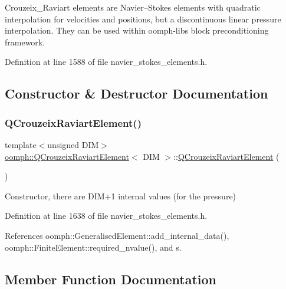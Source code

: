 Crouzeix\+\_\+\+Raviart elements are Navier--Stokes elements with quadratic interpolation for velocities and positions, but a discontinuous linear pressure interpolation. They can be used within oomph-\/lib\textquotesingle{}s block preconditioning framework. 

Definition at line 1588 of file navier\+\_\+stokes\+\_\+elements.\+h.



\subsection{Constructor \& Destructor Documentation}
\mbox{\label{classoomph_1_1QCrouzeixRaviartElement_a958e0749f4de49b210e17ad874f1ee2d}} 
\subsubsection{\texorpdfstring{Q\+Crouzeix\+Raviart\+Element()}{QCrouzeixRaviartElement()}}
{\footnotesize\ttfamily template$<$unsigned D\+IM$>$ \\
\hyperlink{classoomph_1_1QCrouzeixRaviartElement}{oomph\+::\+Q\+Crouzeix\+Raviart\+Element}$<$ D\+IM $>$\+::\hyperlink{classoomph_1_1QCrouzeixRaviartElement}{Q\+Crouzeix\+Raviart\+Element} (\begin{DoxyParamCaption}{ }\end{DoxyParamCaption})\hspace{0.3cm}{\ttfamily [inline]}}



Constructor, there are D\+I\+M+1 internal values (for the pressure) 



Definition at line 1638 of file navier\+\_\+stokes\+\_\+elements.\+h.



References oomph\+::\+Generalised\+Element\+::add\+\_\+internal\+\_\+data(), oomph\+::\+Finite\+Element\+::required\+\_\+nvalue(), and s.



\subsection{Member Function Documentation}
\mbox{\label{classoomph_1_1QCrouzeixRaviartElement_a5b824083683ead3f8bead4061bce21f1}} 

